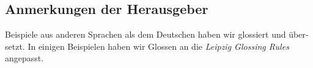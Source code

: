 \documentclass[output=paper, colorlinks, citecolor=brown, booklanguage=german]{langscibook}
\begin{document}
\begin{otherlanguage}{german}
\section*{Anmerkungen der Herausgeber}
Beispiele aus anderen Sprachen als dem Deutschen haben wir glossiert und übersetzt. In einigen Beispielen haben wir Glossen an die \textit{Leipzig Glossing Rules} an\-ge\-passt. 

\printbibliography[heading=subbibliography,notkeyword=this]

\end{otherlanguage}
\end{document}
